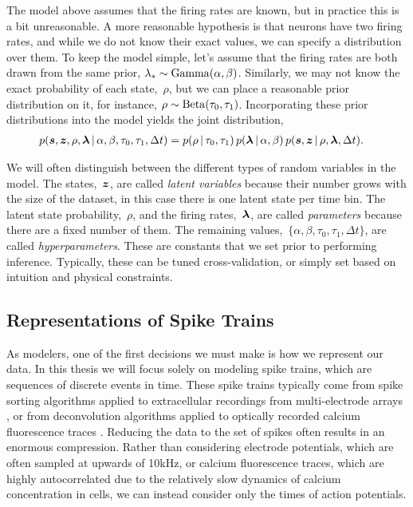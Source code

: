 The model above assumes that the firing rates are known, but in practice 
this is a bit unreasonable. A more reasonable hypothesis is that neurons have 
two firing rates, and while we do not know their exact values, we can 
specify a distribution over them. To keep the model simple, let's assume 
that the firing rates are both drawn from the same prior, 
${\lambda_{*} \sim \mathrm{Gamma}(\alpha, \beta)}$. Similarly, we may not know 
the exact probability of each state,~$\rho$, but we can place a reasonable
 prior distribution on it, for instance, ${\rho \sim \mathrm{Beta}(\tau_0, \tau_1)}$.
Incorporating these prior distributions into the model yields the joint 
distribution,
\begin{align}
  \label{eq:full_joint}
  p(\boldsymbol{s}, \boldsymbol{z}, \rho, \boldsymbol{\lambda} \,|\, \alpha, \beta, \tau_0, \tau_1, \Delta t) 
  &= p(\rho \,|\, \tau_0, \tau_1) \, 
     p(\boldsymbol{\lambda} \,|\, \alpha, \beta) \,
     p(\boldsymbol{s}, \boldsymbol{z} \,|\, \rho, \boldsymbol{\lambda}, \Delta t).
\end{align}

We will often distinguish between the different types of random
variables in the model. The states,~$\boldsymbol{z}$, are called \emph{latent
  variables} because their number grows with the size of the dataset,
in this case there is one latent state per time bin. The latent state
probability,~$\rho$, and the firing rates,~$\boldsymbol{\lambda}$, are called
\emph{parameters} because there are a fixed number of them. The
remaining values,~${\{ \alpha, \beta, \tau_0, \tau_1, \Delta t \} }$,
are called \emph{hyperparameters}. These are constants that we set
prior to performing inference.  Typically, these can be tuned
cross-validation, or simply set based on intuition and physical
constraints.

\subsection{Representations of Spike Trains}
As modelers, one of the first decisions we must make is how we
represent our data. In this thesis we will focus solely on modeling
spike trains, which are sequences of discrete events in time. These
spike trains typically come from spike sorting algorithms applied to
extracellular recordings from multi-electrode arrays
\cite{lewicki1998review, quiroga2004unsupervised}, or from
deconvolution algorithms applied to optically recorded calcium
fluorescence traces \cite{pnevmatikakis2016simultaneous,
  vogelstein2010fast}. Reducing the data to the set of spikes often 
results in an enormous compression. Rather than considering electrode 
potentials, which are often sampled at upwards of 10kHz, or calcium 
fluorescence traces, which are highly autocorrelated due to the relatively 
slow dynamics of calcium concentration in cells, we can instead consider 
only the times of action potentials.

